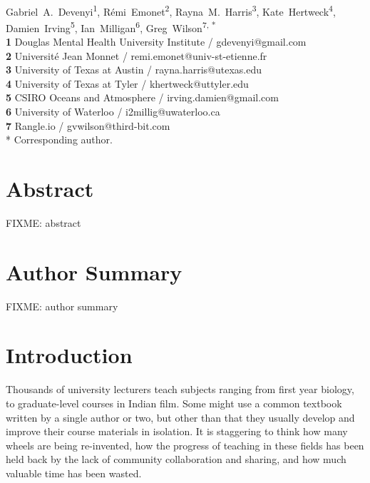 \documentclass[10pt,letterpaper]{article}
\date{}
\begin{document}
\vspace*{0.2in}

\begin{flushleft}
{\Large
\textbf{}
}
\newline
\\
{Gabriel~A.~Devenyi}\textsuperscript{1},
{R\'{e}mi~Emonet}\textsuperscript{2},
{Rayna~M.~Harris}\textsuperscript{3},
{Kate~Hertweck}\textsuperscript{4},
{Damien~Irving}\textsuperscript{5},
{Ian~Milligan}\textsuperscript{6},
{Greg~Wilson}\textsuperscript{7, *}
\\
\textbf{1} Douglas Mental Health University Institute / gdevenyi@gmail.com \\
\textbf{2} Universit\'{e} Jean Monnet / remi.emonet@univ-st-etienne.fr \\
\textbf{3} University of Texas at Austin / rayna.harris@utexas.edu \\
\textbf{4} University of Texas at Tyler / khertweck@uttyler.edu \\
\textbf{5} CSIRO Oceans and Atmosphere / irving.damien@gmail.com \\
\textbf{6} University of Waterloo / i2millig@uwaterloo.ca \\
\textbf{7} Rangle.io / gvwilson@third-bit.com
\\
* Corresponding author.
\end{flushleft}

\section*{Abstract}

FIXME: abstract

\section*{Author Summary}

FIXME: author summary

\section*{Introduction}

Thousands of university lecturers teach subjects ranging from first year biology,
to graduate-level courses in Indian film.
Some might use a common textbook written by a single author or two,
but other than that they usually develop and improve their course materials in isolation.
It is staggering to think how many wheels are being re-invented,
how the progress of teaching in these fields has been held back by
the lack of community collaboration and sharing,
and how much valuable time has been wasted.
\end{document}
